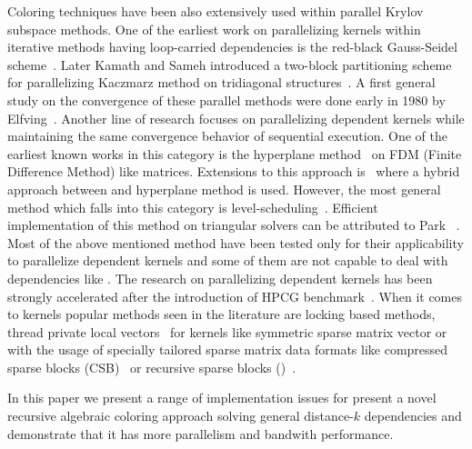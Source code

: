 Coloring techniques have been also extensively used within parallel Krylov subspace methods. One of the earliest work on parallelizing kernels within iterative methods having loop-carried dependencies is the red-black Gauss-Seidel scheme~\cite{RBGS}. Later Kamath and Sameh introduced a two-block partitioning scheme for parallelizing Kaczmarz method on tridiagonal structures~\cite{Kamath}. A first general study on the convergence of these parallel methods were done early in 1980 by Elfving~\cite{Elfving1980}. Another line of research focuses on parallelizing dependent kernels while maintaining the same convergence behavior of sequential execution. One of the earliest known works in this category is the hyperplane method~\cite{saad} on FDM (Finite Difference Method) like matrices. Extensions to this approach is~\cite{cm-rcm} where a hybrid approach between \MCfull and hyperplane method is used. However, the most general method which falls into this category is level-scheduling~\cite{saad}.  Efficient implementation of this method on triangular solvers can be attributed to Park \etal  ~\cite{park_ls}. Most of the above mentioned method have been tested only for their applicability to parallelize \DONE dependent kernels and some of them are not capable to deal with dependencies like \DTWO. The research on parallelizing \DONE dependent kernels has been strongly accelerated after the introduction of HPCG benchmark~\cite{hpcg}. When it comes to \DTWO kernels popular methods seen in the literature are locking based methods, thread private local vectors~\cite{sparseX,thread_private_symm_spmv} for kernels like symmetric sparse matrix vector or with the usage of specially tailored sparse matrix data formats like compressed sparse blocks (CSB)~\cite{CSB} or recursive sparse blocks (\RSB)~\cite{RSB}.


In this paper we present a range of implementation issues for present a novel recursive algebraic coloring approach solving general distance-$k$ dependencies and demonstrate that it has more parallelism and bandwith performance.

